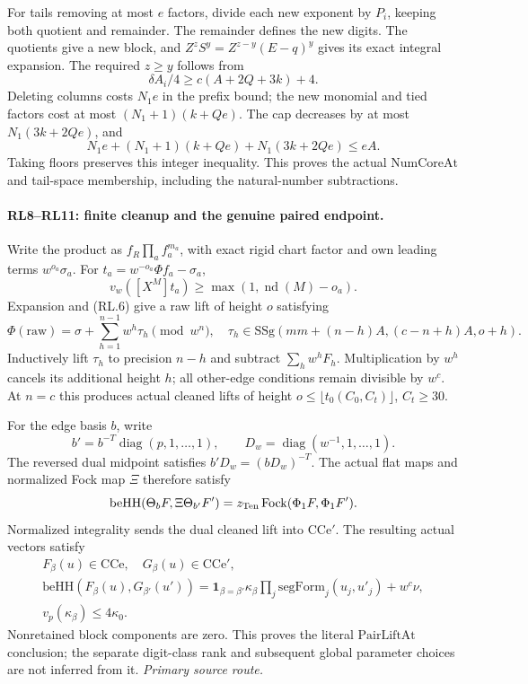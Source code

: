 \documentclass[11pt,a4paper]{article}
\numberwithin{equation}{section}
\theoremstyle{remark}\newtheorem{remark}[theorem]{Remark}
\begin{document}
For tails removing at most \(e\) factors, divide each new exponent by
\(P_i\), keeping both quotient and remainder. The remainder defines
the new digits. The quotients give a new block, and
\(Z^zS^y=Z^{z-y}(E-q)^y\) gives its exact integral expansion.
The required \(z\ge y\) follows from
\[
 \delta A_i/4\ge c(A+2Q+3k)+4.
\]
Deleting columns costs \(N_1e\) in the prefix bound; the new monomial
and tied factors cost at most \((N_1+1)(k+Qe)\). The cap decreases by
at most \(N_1(3k+2Qe)\), and
\[
 N_1e+(N_1+1)(k+Qe)+N_1(3k+2Qe)\le eA.          \tag{RL.6}
\]
Taking floors preserves this integer inequality. This proves the
actual \(\mathrm{NumCoreAt}\) and tail-space membership, including
the natural-number subtractions.

\paragraph{RL8--RL11: finite cleanup and the genuine paired endpoint.}
Write the product as \(f_R\prod_af_a^{m_a}\), with exact rigid
chart factor and own leading terms \(w^{o_a}\sigma_a\).
For \(t_a=w^{-o_a}\Phi f_a-\sigma_a\),
\[
 v_w([X^M]t_a)\ge\max(1,\operatorname{nd}(M)-o_a).
\]
Expansion and (RL.6) give a raw lift of height \(o\) satisfying
\[
 \Phi(\mathrm{raw})=\sigma+\sum_{h=1}^{n-1}w^h\tau_h\pmod{w^n},
 \quad \tau_h\in\mathrm{SSg}(mm+(n-h)A,(c-n+h)A,o+h).
\]
Inductively lift \(\tau_h\) to precision \(n-h\) and subtract
\(\sum_hw^hF_h\). Multiplication by \(w^h\) cancels its additional
height \(h\); all other-edge conditions remain divisible by \(w^c\).
At \(n=c\) this produces actual cleaned lifts of height
\(o\le\lfloor t_0(C_0,C_t)\rfloor\), \(C_t\ge30\).

For the edge basis \(b\), write
\[
 b'=b^{-T}\operatorname{diag}(p,1,\ldots,1),\qquad
 D_w=\operatorname{diag}(w^{-1},1,\ldots,1).
\]
The reversed dual midpoint satisfies \(b'D_w=(bD_w)^{-T}\).
The actual flat maps and normalized Fock map
\(\Xi\) therefore satisfy
\[
 \mathrm{beHH}(\Theta_bF,\Xi\Theta_{b'}F')
          =z_{\rm Ten}\operatorname{Fock}(\Phi_1F,\Phi_1F').
\]
Normalized integrality sends the dual cleaned lift into
\(\mathrm{CCe}'\). The resulting actual vectors satisfy
\[
 \begin{gathered}
 F_\beta(u)\in\mathrm{CCe},\quad G_\beta(u)\in\mathrm{CCe}',\\
 \mathrm{beHH}(F_\beta(u),G_{\beta'}(u'))
 =\mathbf1_{\beta=\beta'}\kappa_\beta
       \prod_j\mathrm{segForm}_j(u_j,u'_j)+w^c\nu ,\\
 v_p(\kappa_\beta)\le4\kappa_0.
 \end{gathered}                                  \tag{RL.7}
\]
Nonretained block components are zero. This proves the literal
\(\mathrm{PairLiftAt}\) conclusion; the separate digit-class rank
and subsequent global parameter choices are not inferred from it.
\noindent\textit{Primary source route.}\cite{paired-lifts-actual}
\end{document}

